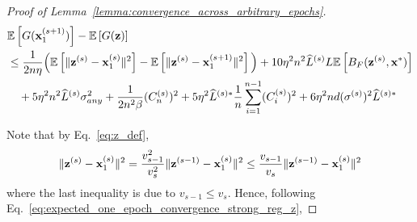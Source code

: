 \begin{proof}[Proof of Lemma~\ref{lemma:convergence_across_arbitrary_epochs}]
    \begin{align}
    \label{eq:expected_one_epoch_convergence_strong_reg_z}
    &\mathbb{E}\left[G({\mathbf{x}}_1^{(s+1)})\right] - \mathbb{E}\left[G({\mathbf{z}})\right]\\
        \nonumber
        &\leq  \frac{1}{2 n \eta}\Big( \mathbb{E}\left[\|{\mathbf{z}}^{(s)} - {\mathbf{x}}_1^{(s)}\|^2\right]  - \mathbb{E}\left[ \|{\mathbf{z}}^{(s)} - {\mathbf{x}}_1^{(s+1)}\|^2 \right] \Big)
        + 10\eta^2 n^2 \widehat{L}^{(s)} L \mathbb{E}\left[  B_F({\mathbf{z}}^{(s)}, {\mathbf{x}}^*)\right]\\
        \nonumber
        &\quad + 5 \eta^2 n^2 \widehat{L}^{(s)}\sigma_{any}^2
        + \frac{1}{2n^2 \beta}(C_n^{(s)})^2 
         +  5\eta^2 \widehat{L}^{(s)*} \frac{1}{n} \sum_{i=1}^{n-1}(C_i^{(s)})^2
         + 6 \eta^2 nd (\sigma^{(s)})^2 \widehat{L}^{(s)*}
    \end{align}

    Note that by Eq.~\ref{eq:z_def},
    \begin{align}
        \|{\mathbf{z}}^{(s)} - {\mathbf{x}}_1^{(s)}\|^2 = \frac{v_{s-1}^2}{v_s^2} \| {\mathbf{z}}^{(s-1)} - {\mathbf{x}}_1^{(s)}\|^2
        \leq \frac{v_{s-1}}{v_s}\|{\mathbf{z}}^{(s-1)} - {\mathbf{x}}_1^{(s)}\|^2
    \end{align}
    where the last inequality is due to $v_{s-1} \leq v_s$. Hence, following Eq.~\ref{eq:expected_one_epoch_convergence_strong_reg_z},


\end{proof}
